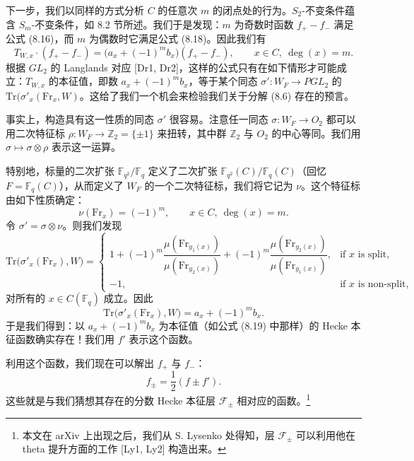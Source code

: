 下一步，我们以同样的方式分析 $C$ 的任意次 $m$ 的闭点处的行为。$S_2$-不变条件蕴含 $S_m$-不变条件，如 8.2 节所述。我们于是发现：$m$ 为奇数时函数 $f_+ - f_-$ 满足公式 (8.16)，而 $m$ 为偶数时它满足公式 (8.18)。因此我们有
\begin{equation}\tag{8.19}
T_{W,x}\cdot (f_+ - f_-) = \bigl(a_x + (-1)^m b_x\bigr)(f_+ - f_-), \qquad x\in C,\ \deg(x) = m.
\end{equation}
根据 $GL_2$ 的 Langlands 对应 [Dr1, Dr2]，这样的公式只有在如下情形才可能成立：$T_{W,x}$ 的本征值，即数 $a_x + (-1)^m b_x$，等于某个同态 $\sigma' : W_F \to PGL_2$ 的 $\mathrm{Tr}(\sigma'_x(\mathrm{Fr}_x, W)$。这给了我们一个机会来检验我们关于分解 (8.6) 存在的预言。


事实上，构造具有这一性质的同态 $\sigma'$ 很容易。注意任一同态 $\sigma : W_F \to O_2$ 都可以用二次特征标 $\rho : W_F \to \mathbb{Z}_2 = \{\pm 1\}$ 来扭转，其中群 $\mathbb{Z}_2$ 与 $O_2$ 的中心等同。我们用 $\sigma \mapsto \sigma\otimes\rho$ 表示这一运算。

特别地，标量的二次扩张 $\mathbb{F}_{q^2}/\mathbb{F}_q$ 定义了二次扩张 $\mathbb{F}_{q^2}(C)/\mathbb{F}_q(C)$（回忆 $F = \mathbb{F}_q(C)$），从而定义了 $W_F$ 的一个二次特征标，我们将它记为 $\nu$。这个特征标由如下性质确定：
\begin{equation}\tag{8.20}
\nu(\mathrm{Fr}_x) = (-1)^m, \qquad x\in C,\ \deg(x) = m.
\end{equation}
令 $\sigma' = \sigma\otimes \nu$。则我们发现
\[
\mathrm{Tr}\bigl(\sigma'_x(\mathrm{Fr}_x), W\bigr) = \begin{cases} 1 + (-1)^m\dfrac{\mu(\mathrm{Fr}_{y_1(x)})}{\mu(\mathrm{Fr}_{y_2(x)})} + (-1)^m\dfrac{\mu(\mathrm{Fr}_{y_2(x)})}{\mu(\mathrm{Fr}_{y_1(x)})}, & \text{if } x \text{ is split},\\[10pt] -1, & \text{if } x \text{ is non-split},\end{cases}
\]
对所有的 $x\in C(\mathbb{F}_q)$ 成立。因此
\[
\mathrm{Tr}\bigl(\sigma'_x(\mathrm{Fr}_x), W\bigr) = a_x + (-1)^m b_x.
\]
于是我们得到：以 $a_x + (-1)^m b_x$ 为本征值（如公式 (8.19) 中那样）的 Hecke 本征函数确实存在！我们用 $f'$ 表示这个函数。

利用这个函数，我们现在可以解出 $f_+$ 与 $f_-$：
\begin{equation}\tag{8.21}
f_\pm = \frac{1}{2}(f\pm f').
\end{equation}
这些就是与我们猜想其存在的分数 Hecke 本征层 $\mathcal{F}_\pm$ 相对应的函数。\footnote{本文在 arXiv 上出现之后，我们从 S. Lysenko 处得知，层 $\mathcal{F}_\pm$ 可以利用他在 theta 提升方面的工作 [Ly1, Ly2] 构造出来。}

